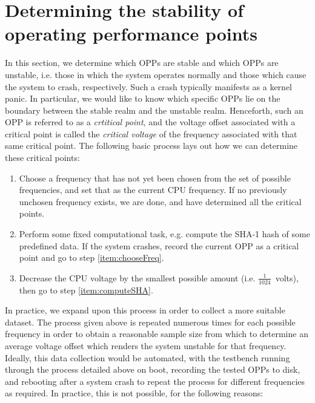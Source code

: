 \section{Determining the stability of operating performance points}
\label{sec:unstableOPPs}

In this section, we determine which OPPs are stable and which OPPs are unstable,
i.e. those in which the system operates normally and those which cause the system
to crash, respectively. Such a crash typically manifests as a kernel panic.
In particular, we would like to know which specific OPPs lie on the boundary
between the stable realm and the unstable realm. Henceforth, such an OPP is
referred to as a \textit{crtitical point}, and the voltage offset associated
with a critical point is called the \textit{critical voltage} of the frequency
associated with that same critical point. The following basic process lays out
how we can determine these critical points:

\begin{enumerate}
    \item \label{item:chooseFreq} Choose a frequency that has not yet been
        chosen from the set of possible frequencies, and set that as the current
        CPU frequency. If no previously unchosen frequency exists, we are done,
        and have determined all the critical points.
    \item \label{item:computeSHA} Perform some fixed computational task, e.g.
        compute the SHA-1 hash of some predefined data. If the system crashes,
        record the current OPP as a critical point and go to step
        \ref{item:chooseFreq}.
    \item \label{item:undervolt} Decrease the CPU voltage by the smallest
        possible amount (i.e. $\frac{1}{1024}$~volts), then go to step
        \ref{item:computeSHA}.
\end{enumerate}

In practice, we expand upon this process in order to collect a more suitable
dataset. The process given above is repeated numerous times for each possible
frequency in order to obtain a reasonable sample size from which to determine
an average voltage offset which renders the system unstable for that frequency.
Ideally, this data collection would be automated, with the testbench running
through the process detailed above on boot, recording the tested OPPs to disk,
and rebooting after a system crash to repeat the process for different
frequencies as required. In practice, this is not possible, for the following
reasons:


